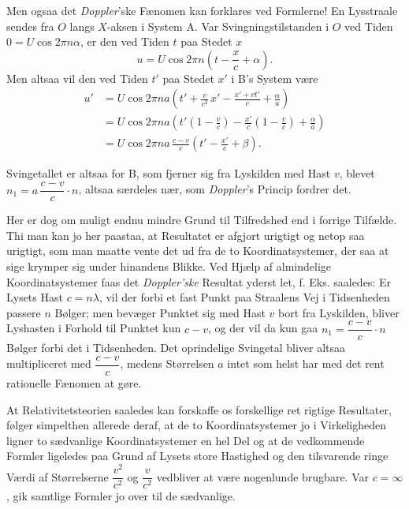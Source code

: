 \documentclass[12pt,a4paper]{article}
\newcommand{\opage}[1]{\marginnote{\footnotesize\textit{[#1]}}}
\begin{document}
Men ogsaa det \emph{Doppler}'ske Fænomen kan forklares ved Formlerne! En
Lysstraale sendes fra $O$ langs $X$-aksen i System A. Var Svingningstilstanden i
$O$ ved Tiden $0 = U \cos 2\pi n\alpha$, er den ved Tiden $t$ paa Stedet $x$
\opage{23} \[
  u = U \cos 2\pi n \left(t - \frac{x}{c} + \alpha\right).
\]
Men altsaa vil den ved Tiden $t'$ paa Stedet $x'$ i B's System være
\begin{align*}
  u' &= U \cos 2\pi na\left(t' + \frac{v}{c^{2}}\,x' - \frac{x' + vt'}{c}
        + \frac{\alpha}{a}\right)\\
     &= U \cos 2\pi na\left(t'\left(1 - \frac{v}{c}\right)
        - \frac{x'}{c}\left(1 - \frac{v}{c}\right) + \frac{\alpha}{a}\right)\\
     &= U \cos 2\pi na\,\frac{c - v}{c}\left(t' - \frac{x'}{c} + \beta\right).
\end{align*}

Svingetallet er altsaa for B, som fjerner sig fra Lyskilden med Hast $v$,
blevet $n_{1} = a\,\dfrac{c - v}{c}\cdot n$, altsaa særdeles nær, som
\guillemotright\emph{Doppler}'s Princip\guillemotleft{} fordrer det.

Her er dog om muligt endnu mindre Grund til Tilfredshed end i forrige Tilfælde.
Thi man kan jo her paastaa, at Resultatet er afgjort urigtigt og netop saa
urigtigt, som man maatte vente det ud fra de to Koordinatsystemer, der saa at
sige krymper sig under hinandens Blikke. Ved Hjælp af almindelige
Koordinatsystemer faas det \emph{Doppler'ske} Resultat yderst let, f. Eks.
saaledes: Er Lysets Hast $c = n\lambda$, vil der forbi et fast Punkt paa
Straalens Vej i Tidsenheden passere $n$ Bølger; men bevæger Punktet sig med
Hast $v$ bort fra Lyskilden, bliver Lyshasten i Forhold til Punktet kun
$c - v$, og der vil da kun gaa $n_{1} = \dfrac{c - v}{c}\cdot n$ Bølger forbi
det i Tidsenheden. Det oprindelige Svingetal bliver altsaa multipliceret med
$\dfrac{c - v}{c}$, medens Størrelsen $a$ intet som helst har med det rent
rationelle Fænomen at gøre.

At Relativitetsteorien saaledes kan forskaffe os forskellige ret rigtige
Resultater, følger simpelthen allerede deraf, at de to Koordinatsystemer jo i
Virkeligheden ligner to sædvanlige Koordinatsystemer en hel Del og at de
vedkommende Formler ligeledes paa Grund af Lysets store Hastighed og den
tilsvarende ringe Værdi af Størrelserne $\dfrac{v^{2}}{c^{2}}$ og
$\dfrac{v}{c^{2}}$ vedbliver at være nogenlunde brugbare. Var $c = \infty$, gik
samtlige Formler jo over til de sædvanlige.
\end{document}
